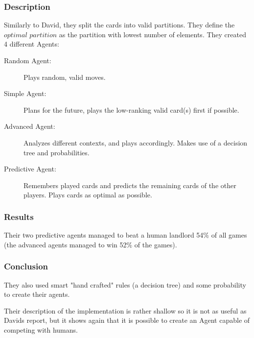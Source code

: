 \documentclass{article}
\begin{document}
\subsubsection*{Description}
Similarly to David, they split the cards into valid partitions. They define the $optimal$ $partition$ as the partition with lowest number of elements.
They created 4 different Agents:
\begin{description}
    \item[Random Agent:] Plays random, valid moves.
    \item[Simple Agent:] Plans for the future, plays the low-ranking valid card(s) first if possible.
    \item[Advanced Agent:] Analyzes different contexts, and plays accordingly. Makes use of a decision tree and probabilities.
    \item[Predictive Agent:] Remembers played cards and predicts the remaining cards of the other players. Plays cards as optimal as possible.
\end{description}

\subsubsection{Results}
Their two predictive agents managed to beat a human landlord 54\% of all games (the advanced agents managed to win 52\% of the games).

\subsubsection{Conclusion}
They also used smart "hand crafted" rules (a decision tree) and some probability to create their agents.

Their description of the implementation is rather shallow so it is not as useful as Davids report, but it shows again that it is possible to create an Agent capable of competing with humans.
\end{document}
